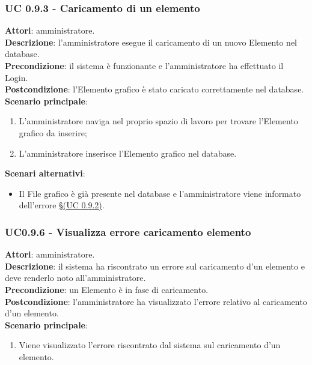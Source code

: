 \subsubsection{UC 0.9.3 - Caricamento di un elemento}{
	\label{uc0.9.3}
	\textbf{Attori}: amministratore. \\
	\textbf{Descrizione}: l'amministratore esegue il caricamento di un nuovo Elemento nel database. \\
	\textbf{Precondizione}: il sistema  è funzionante e l'amministratore ha effettuato il Login.	\\
	\textbf{Postcondizione}: l'Elemento grafico è stato caricato correttamente nel database.	\\
	\textbf{Scenario principale}:
	\begin{enumerate}
		\item L'amministratore naviga nel proprio spazio di lavoro per trovare l'Elemento grafico da inserire;
		\item L'amministratore inserisce l'Elemento grafico nel database.
	\end{enumerate}
	\textbf{Scenari alternativi}:
	\begin{itemize}
		\item Il File grafico è già presente nel database e l'amministratore viene informato dell'errore \S\hyperref[uc0.9.2]{(UC 0.9.2)}.
	\end{itemize}
	}
\subsubsection{UC0.9.6 - Visualizza errore caricamento elemento}{
	\label{uc0.9.2}
	\textbf{Attori}: amministratore. \\
	\textbf{Descrizione}: il sistema ha riscontrato un errore sul caricamento d'un elemento e deve renderlo noto all'amministratore. \\
	\textbf{Precondizione}: un Elemento è in fase di caricamento.	\\
	\textbf{Postcondizione}: l'amministratore ha visualizzato l'errore relativo al caricamento d'un elemento.	\\
	\textbf{Scenario principale}:
	\begin{enumerate}
		\item Viene visualizzato l'errore riscontrato dal sistema sul caricamento d'un elemento.
	\end{enumerate}
	}
